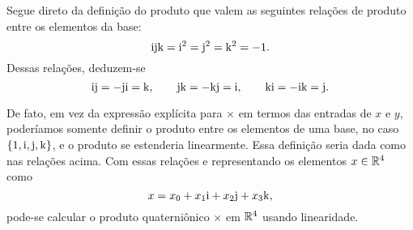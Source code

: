 Segue direto da definição do produto que valem as seguintes relações de produto entre os elementos da base:
	\begin{equation*}
	\mathrm{i}\mathrm{j}\mathrm{k} = \mathrm{i}^2 = \mathrm{j}^2 = \mathrm{k}^2 = - 1.
	\end{equation*}
Dessas relações, deduzem-se
	\begin{equation*}
	\mathrm{i}\mathrm{j} = -\mathrm{j}\mathrm{i} = \mathrm{k}, \qquad \mathrm{j}\mathrm{k} = -\mathrm{k}\mathrm{j} = \mathrm{i}, \qquad \mathrm{k}\mathrm{i} = -\mathrm{i}\mathrm{k} = \mathrm{j}.
	\end{equation*}

De fato, em vez da expressão explícita para $\times$ em termos das entradas de $x$ e $y$, poderíamos somente definir o produto entre os elementos de uma base, no caso $\{1,\mathrm{i}, \mathrm{j}, \mathrm{k}\}$, e o produto se estenderia linearmente. Essa definição seria dada como nas relações acima. Com essas relações e representando os elementos $x \in \mathbb{R}^4$ como
	\begin{equation*}
	x = x_0 + x_1 \mathrm{i} + x_2 \mathrm{j} + x_3 \mathrm{k},
	\end{equation*}
pode-se calcular o produto quaterniônico $\times$ em $\mathbb{R}^4$ usando linearidade.

\begin{comment}

Por linearidade, deve valer
	\begin{align*}
	xy &= (x_0 1  + x_1 \ii + x_2 \jj + x_3 \kk)(y_0 1  + y_1 \ii + y_2 \jj + y_3 \kk) \\
		&= x_0 y_0 1  1  + x_0 y_1 1  \ii + x_0 y_2 1  \jj + x_0 y_3 1  \kk \\
		&+ x_1 y_0 \ii  1  + x_1 y_1 \ii  \ii + x_1y_2 \ii  \jj + x_1 y_3 \ii  \kk \\
		&+ x_2 y_0 \jj 1  + x_2 y_1 \jj \ii + x_2 y_2 \jj \jj + x_2 y_3 \jj \kk \\
		&+ x_3 y_0 \kk 1  + x_3 y_1 \kk \ii + x_3 y_2 \kk \jj + x_3 y_3 \kk \kk
	\end{align*}

Portanto basta definir os valores dos produtos entre $1,i,j,k$. Escolhendo $1$ para ser a unidade, já que deve haver uma unidade (e essa notação não foi escolhida por acaso para $(1,0,0,0)$), basta determinarmos
	\begin{equation*}
	\ii\ii,\ii\jj,\ii\kk,\jj\ii,\jj\ij,\jj\kk,\kk\ii,\kk\jj,\kk\kk.
	\end{equation*}

\end{comment}

